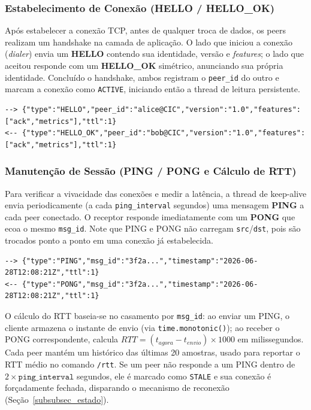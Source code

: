 \documentclass[12pt, a4paper]{article}
\begin{document}
\subsubsection{Estabelecimento de Conexão (HELLO / HELLO\_OK)}
Após estabelecer a conexão TCP, antes de qualquer troca de dados, os peers realizam um handshake na camada de aplicação. O lado que iniciou a conexão (\textit{dialer}) envia um \textbf{HELLO} contendo sua identidade, versão e \textit{features}; o lado que aceitou responde com um \textbf{HELLO\_OK} simétrico, anunciando sua própria identidade. Concluído o handshake, ambos registram o \texttt{peer\_id} do outro e marcam a conexão como \texttt{ACTIVE}, iniciando então a thread de leitura persistente.

\begin{lstlisting}[style=terminal]
--> {"type":"HELLO","peer_id":"alice@CIC","version":"1.0","features":["ack","metrics"],"ttl":1}
<-- {"type":"HELLO_OK","peer_id":"bob@CIC","version":"1.0","features":["ack","metrics"],"ttl":1}
\end{lstlisting}

\subsubsection{Manutenção de Sessão (PING / PONG e Cálculo de RTT)}
Para verificar a vivacidade das conexões e medir a latência, a thread de keep-alive envia periodicamente (a cada \texttt{ping\_interval} segundos) uma mensagem \textbf{PING} a cada peer conectado. O receptor responde imediatamente com um \textbf{PONG} que ecoa o mesmo \texttt{msg\_id}. Note que PING e PONG não carregam \texttt{src}/\texttt{dst}, pois são trocados ponto a ponto em uma conexão já estabelecida.

\begin{lstlisting}[style=terminal]
--> {"type":"PING","msg_id":"3f2a...","timestamp":"2026-06-28T12:08:21Z","ttl":1}
<-- {"type":"PONG","msg_id":"3f2a...","timestamp":"2026-06-28T12:08:21Z","ttl":1}
\end{lstlisting}

O cálculo do RTT baseia-se no casamento por \texttt{msg\_id}: ao enviar um PING, o cliente armazena o instante de envio (via \texttt{time.monotonic()}); ao receber o PONG correspondente, calcula $RTT = (t_{agora} - t_{envio}) \times 1000$ em milissegundos. Cada peer mantém um histórico das últimas 20 amostras, usado para reportar o RTT médio no comando \texttt{/rtt}. Se um peer não responde a um PING dentro de $2 \times \texttt{ping\_interval}$ segundos, ele é marcado como \texttt{STALE} e sua conexão é forçadamente fechada, disparando o mecanismo de reconexão (Seção~\ref{subsubsec_estado}).
\end{document}
